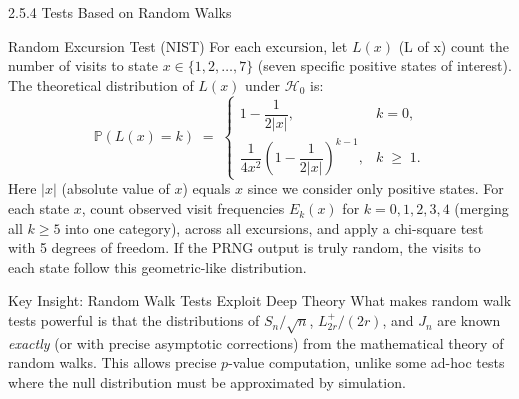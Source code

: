 \documentclass[aspectratio=169,10pt]{beamer}
\begin{document}
\begin{frame}[allowframebreaks]{2.5.4 Tests Based on Random Walks}
\begin{block}{Random Excursion Test (NIST)}
For each excursion, let $L(x)$ (L of x) count the number of visits to
state $x \in \{1, 2, \ldots, 7\}$ (seven specific positive states of
interest).  The theoretical distribution of $L(x)$ under $\mathcal{H}_0$
is:
\[
  \mathbb{P}(L(x) = k) \;=\;
  \begin{cases}
    1 - \dfrac{1}{2|x|}, & k = 0, \\[8pt]
    \dfrac{1}{4x^2}\!\left(1-\dfrac{1}{2|x|}\right)^{k-1}, & k \;\ge\; 1.
  \end{cases} \tag{2.5.22}
\]
Here $|x|$ (absolute value of $x$) equals $x$ since we consider only
positive states.  For each state $x$, count observed visit frequencies
$E_k(x)$ for $k = 0, 1, 2, 3, 4$ (merging all $k \ge 5$ into one
category), across all excursions, and apply a chi-square test with 5
degrees of freedom.  If the PRNG output is truly random, the visits
to each state follow this geometric-like distribution.
\end{block}

\begin{alertblock}{Key Insight: Random Walk Tests Exploit Deep Theory}
What makes random walk tests powerful is that the distributions of
$S_n/\sqrt{n}$, $L_{2r}^+/(2r)$, and $J_n$ are known \emph{exactly}
(or with precise asymptotic corrections) from the mathematical theory
of random walks.  This allows precise $p$-value computation, unlike
some ad-hoc tests where the null distribution must be approximated
by simulation.
\end{alertblock}

\end{frame}
\end{document}
